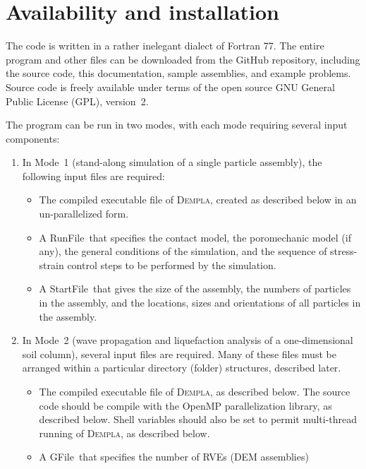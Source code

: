 \documentclass[letterpaper,11pt]{article}
\newcommand{\Dempla}{\textsc{Dempla}}
\newcommand{\RunFile}{\textsf{RunFile}}
\newcommand{\StartFile}{\textsf{StartFile}}
\newcommand{\GFile}{\textsf{GFile}}
\begin{document}
\section{Availability and installation}\label{sec:installation}
The code is written in a rather inelegant dialect of Fortran 77.
The entire program and other files can be downloaded from the
GitHub repository,
including the source code, this documentation,
sample assemblies, and example problems.
Source code is freely available under terms of the open source GNU General
Public License (GPL), version~2.
\par
The program can be run in two modes,
with each mode requiring several input components:
\begin{enumerate}
	\item
	  In Mode~1
	  (stand-along simulation of a single particle assembly),
	  the following input files are required:
	  \begin{itemize}
	     \item
	       The compiled executable file of \Dempla,
	       created as described below in an un-parallelized form.
	     \item
	       A \RunFile\ that specifies the contact model,
	       the poromechanic model (if any),
	       the general conditions of the simulation,
	       and the sequence of stress-strain control steps
	       to be performed by the simulation.
	     \item
	       A \StartFile\ that gives the size of the assembly,
	       the numbers of particles in the assembly,
	       and the locations, sizes and orientations of
	       all particles in the assembly.
	  \end{itemize}
    \item
      In Mode~2 (wave propagation and liquefaction
      analysis of a one-dimensional soil column),
      several input files are required.
      Many of these files must be arranged within a particular
      directory (folder) structures, described later.
      \begin{itemize}
      	\item
          The compiled executable file of \Dempla, as described below.
          The source code should be compile with the OpenMP parallelization
          library, as described below.
          Shell variables should also be set to permit multi-thread
          running of \Dempla, as described below.
        \item
          A \GFile\ that specifies the number of 
          RVEs (DEM assemblies)

\end{itemize}
\end{enumerate}
\end{document}
